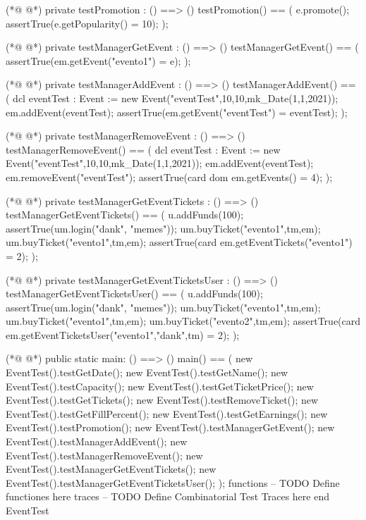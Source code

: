 \begin{vdmpp}[breaklines=true]
(*@
\label{testPromotion:76}
@*)
 private testPromotion : () ==> ()
 testPromotion() == (
  e.promote();
  assertTrue(e.getPopularity() = 10);
 );
 
(*@
\label{testManagerGetEvent:82}
@*)
 private testManagerGetEvent : () ==> ()
 testManagerGetEvent() == (
  assertTrue(em.getEvent("evento1") = e);
 );
 
(*@
\label{testManagerAddEvent:87}
@*)
 private testManagerAddEvent : () ==> ()
 testManagerAddEvent() == (
  dcl eventTest : Event := new Event("eventTest",10,10,mk_Date(1,1,2021));
  em.addEvent(eventTest);
  assertTrue(em.getEvent("eventTest") = eventTest);
 );
 
(*@
\label{testManagerRemoveEvent:94}
@*)
 private testManagerRemoveEvent : () ==> ()
 testManagerRemoveEvent() == (
  dcl eventTest : Event := new Event("eventTest",10,10,mk_Date(1,1,2021));
  em.addEvent(eventTest);
  em.removeEvent("eventTest");
  assertTrue(card dom em.getEvents() = 4);
 );
 
(*@
\label{testManagerGetEventTickets:102}
@*)
 private testManagerGetEventTickets : () ==> ()
 testManagerGetEventTickets() == (
  u.addFunds(100);
  assertTrue(um.login("dank", "memes"));
  um.buyTicket("evento1",tm,em);
  um.buyTicket("evento1",tm,em);
  assertTrue(card em.getEventTickets("evento1") = 2);
 );
 
(*@
\label{testManagerGetEventTicketsUser:111}
@*)
 private testManagerGetEventTicketsUser : () ==> ()
 testManagerGetEventTicketsUser() == (
  u.addFunds(100);
  assertTrue(um.login("dank", "memes"));
  um.buyTicket("evento1",tm,em);
  um.buyTicket("evento1",tm,em);
  um.buyTicket("evento2",tm,em);
  assertTrue(card em.getEventTicketsUser("evento1","dank",tm) = 2);
 );
 
(*@
\label{main:121}
@*)
 public static main: () ==> ()
 main() == (
  new EventTest().testGetDate();
  new EventTest().testGetName();
  new EventTest().testCapacity();
  new EventTest().testGetTicketPrice();
  new EventTest().testGetTickets();
  new EventTest().testRemoveTicket();
  new EventTest().testGetFillPercent();
  new EventTest().testGetEarnings();
  new EventTest().testPromotion();
  new EventTest().testManagerGetEvent();
  new EventTest().testManagerAddEvent();
  new EventTest().testManagerRemoveEvent();
  new EventTest().testManagerGetEventTickets();
  new EventTest().testManagerGetEventTicketsUser();
 );
functions
-- TODO Define functiones here
traces
-- TODO Define Combinatorial Test Traces here
end EventTest
\end{vdmpp}
